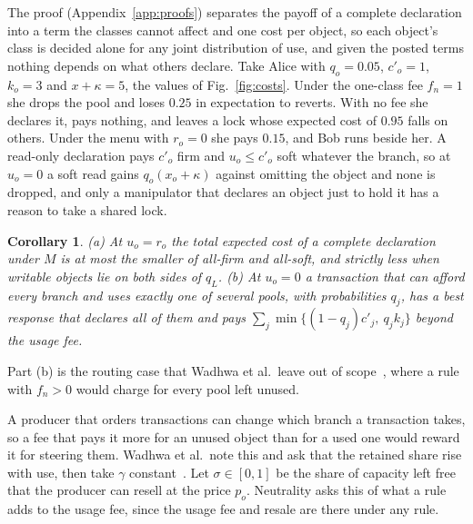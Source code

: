 \documentclass[conference,compsoc]{IEEEtran}
\numberwithin{equation}{section}
\theoremstyle{plain}
\newtheorem{corollary}[theorem]{Corollary}
\theoremstyle{definition}
\theoremstyle{remark}
\newcommand{\cp}{c'}
\newcommand{\qL}{q_L}
\begin{document}
The proof (Appendix~\ref{app:proofs}) separates the payoff of a complete declaration into a term the classes cannot affect and one cost per object, so each object's class is decided alone for any joint distribution of use, and given the posted terms nothing depends on what others declare. Take Alice with $q_o = 0.05$, $\cp_o = 1$, $k_o = 3$ and $x + \kappa = 5$, the values of Fig.~\ref{fig:costs}. Under the one-class fee $f_n = 1$ she drops the pool and loses $0.25$ in expectation to reverts. With no fee she declares it, pays nothing, and leaves a lock whose expected cost of $0.95$ falls on others. Under the menu with $r_o = 0$ she pays $0.15$, and Bob runs beside her. A read-only declaration pays $\cp_o$ firm and $u_o \le \cp_o$ soft whatever the branch, so at $u_o = 0$ a soft read gains $q_o(x_o + \kappa)$ against omitting the object and none is dropped, and only a manipulator that declares an object just to hold it has a reason to take a shared lock.

\begin{corollary}\label{cor:between}
\textup{(a)} At $u_o = r_o$ the total expected cost of a complete declaration under $M$ is at most the smaller of all-firm and all-soft, and strictly less when writable objects lie on both sides of $\qL$. \textup{(b)} At $u_o = 0$ a transaction that can afford every branch and uses exactly one of several pools, with probabilities $q_j$, has a best response that declares all of them and pays $\sum_j \min\{(1-q_j)\cp_j,\ q_j k_j\}$ beyond the usage fee.
\end{corollary}

Part (b) is the routing case that Wadhwa et al.\ leave out of scope~\cite[p.~1090]{wadhwa2026perils}, where a rule with $f_n > 0$ would charge for every pool left unused.

A producer that orders transactions can change which branch a transaction takes, so a fee that pays it more for an unused object than for a used one would reward it for steering them. Wadhwa et al.\ note this and ask that the retained share rise with use, then take $\gamma$ constant~\cite[p.~1091]{wadhwa2026perils}. Let $\sigma \in [0,1]$ be the share of capacity left free that the producer can resell at the price $p_o$. Neutrality asks this of what a rule adds to the usage fee, since the usage fee and resale are there under any rule.
\end{document}
